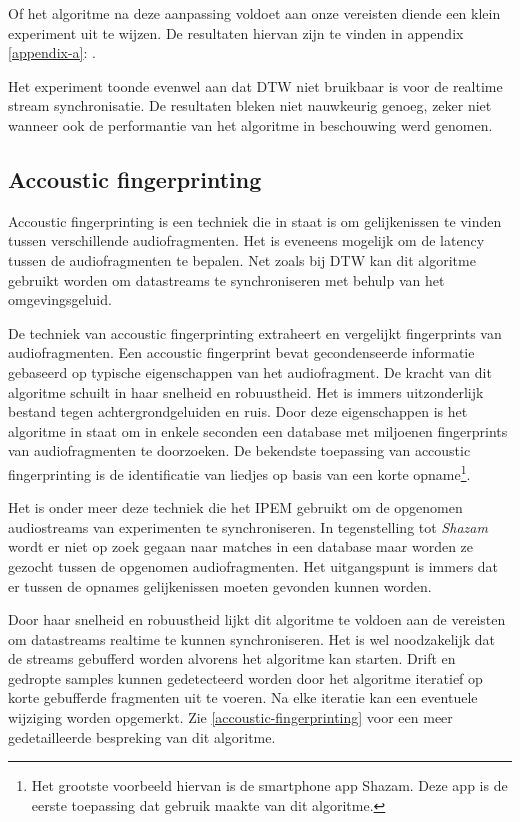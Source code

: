 Of het algoritme na deze aanpassing voldoet aan onze vereisten diende een klein experiment uit te wijzen. De resultaten hiervan zijn te vinden in appendix \ref{appendix-a}: .

Het experiment toonde evenwel aan dat DTW niet bruikbaar is voor de realtime stream synchronisatie. De resultaten bleken niet nauwkeurig genoeg, zeker niet wanneer ook de performantie van het algoritme in beschouwing werd genomen.

\subsection{Accoustic fingerprinting}

Accoustic fingerprinting is een techniek die in staat is om gelijkenissen te vinden tussen verschillende audiofragmenten. Het is eveneens mogelijk om de latency tussen de audiofragmenten te bepalen. Net zoals bij DTW kan dit algoritme gebruikt worden om datastreams te synchroniseren met behulp van het omgevingsgeluid.

De techniek van accoustic fingerprinting extraheert en vergelijkt fingerprints van audiofragmenten. Een accoustic fingerprint bevat gecondenseerde informatie gebaseerd op typische eigenschappen van het audiofragment. De kracht van dit algoritme schuilt in haar snelheid en robuustheid. Het is immers uitzonderlijk bestand tegen achtergrondgeluiden en ruis. Door deze eigenschappen is het algoritme in staat om in enkele seconden een database met miljoenen fingerprints van audiofragmenten te doorzoeken. De bekendste toepassing van accoustic fingerprinting is de identificatie van liedjes op basis van een korte opname\footnote{Het grootste voorbeeld hiervan is de smartphone app Shazam. Deze app is de eerste toepassing dat gebruik maakte van dit algoritme.}.

Het is onder meer deze techniek die het IPEM gebruikt om de opgenomen audiostreams van experimenten te synchroniseren. In tegenstelling tot \textit{Shazam} wordt er niet op zoek gegaan naar matches in een database maar worden ze gezocht tussen de opgenomen audiofragmenten. Het uitgangspunt is immers dat er tussen de opnames gelijkenissen moeten gevonden kunnen worden.

Door haar snelheid en robuustheid lijkt dit algoritme te voldoen aan de vereisten om datastreams realtime te kunnen synchroniseren. Het is wel noodzakelijk dat de streams gebufferd worden alvorens het algoritme kan starten. Drift en gedropte samples kunnen gedetecteerd worden door het algoritme iteratief op korte gebufferde fragmenten uit te voeren. Na elke iteratie kan een eventuele wijziging worden opgemerkt. Zie \ref{accoustic-fingerprinting} voor een meer gedetailleerde bespreking van dit algoritme.

